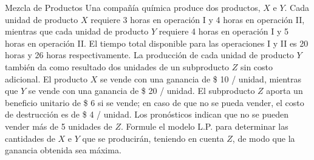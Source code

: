 \begin{frameExample}{Mezcla de Productos}{}
Una compañía química produce dos productos, $X$ e $Y$. Cada unidad de producto $X$ requiere 3 horas en operación I y 4 horas en operación II, mientras que cada unidad de producto $Y$ requiere 4 horas en operación I y 5 horas en operación II. El tiempo total disponible para las operaciones I y II es 20 horas y 26 horas respectivamente. La producción de cada unidad de producto $Y$ también da como resultado dos unidades de un subproducto $Z$ sin costo adicional. El producto $X$ se vende con una ganancia de \$ 10 / unidad, mientras que $Y$ se vende con una ganancia de \$ 20 / unidad. El subproducto $Z$ aporta un beneficio unitario de \$ 6 si se vende; en caso de que no se pueda vender, el costo de destrucción es de \$ 4 / unidad. Los pronósticos indican que no se pueden vender más de 5 unidades de $Z$. Formule el modelo L.P. para determinar las cantidades de $X$ e $Y$ que se producirán, teniendo en cuenta $Z$, de modo que la ganancia obtenida sea máxima.
    
\end{frameExample}



